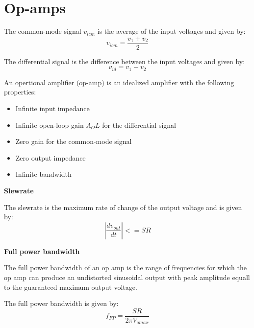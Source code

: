 \section{Op-amps}

The common-mode signal $v_{icm}$ is the average of the input voltages and given by:
$$v_{icm} = \frac{v_1 + v_2}{2}$$

The differential signal is the difference between the input voltages and given by:
$$v_{id} = v_1 - v_2$$

An opertional amplifier (op-amp) is an idealized amplifier with the following properties:
\begin{itemize}
	\item{Infinite input impedance}
	\item{Infinite open-loop gain $A_OL$ for the differential signal}
	\item{Zero gain for the common-mode signal}
	\item{Zero output impedance}
	\item{Infinite bandwidth}
\end{itemize}


\textbf{Slewrate}

The slewrate is the maximum rate of change of the output voltage and is given by:
$$| \frac{dv_{out}}{dt}| <= SR$$

\textbf{Full power bandwidth}

The full power bandwidth of an op amp is
the range of frequencies for which the op amp can produce an
undistorted sinusoidal output with peak amplitude equall to the guaranteed
maximum output voltage.

The full power bandwidth is given by:
$$f_{FP} = \frac{SR}{2\pi V_{o max}}$$
